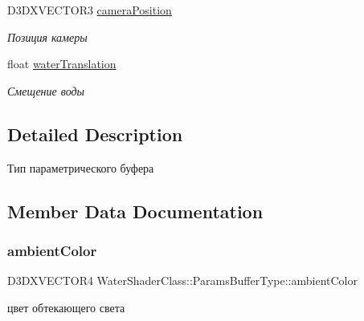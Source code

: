 \begin{DoxyCompactItemize}
D3\+D\+X\+V\+E\+C\+T\+O\+R3 \hyperlink{struct_water_shader_class_1_1_params_buffer_type_ad042a713daeed33ea536ebdbb98cee4b}{camera\+Position}
\begin{DoxyCompactList}\small\item\em Позиция камеры \end{DoxyCompactList}\item 
float \hyperlink{struct_water_shader_class_1_1_params_buffer_type_a77b9c77939a39a3a342ed318578bf78c}{water\+Translation}
\begin{DoxyCompactList}\small\item\em Смещение воды \end{DoxyCompactList}\end{DoxyCompactItemize}


\subsection{Detailed Description}
Тип параметрического буфера 

\subsection{Member Data Documentation}
\mbox{\label{struct_water_shader_class_1_1_params_buffer_type_a0ad650837dee212fd3af2aa4c221a0d5}} 
\subsubsection{\texorpdfstring{ambient\+Color}{ambientColor}}
{\footnotesize\ttfamily D3\+D\+X\+V\+E\+C\+T\+O\+R4 Water\+Shader\+Class\+::\+Params\+Buffer\+Type\+::ambient\+Color}



цвет обтекающего света 

\mbox{\label{struct_water_shader_class_1_1_params_buffer_type_ad042a713daeed33ea536ebdbb98cee4b}} 
